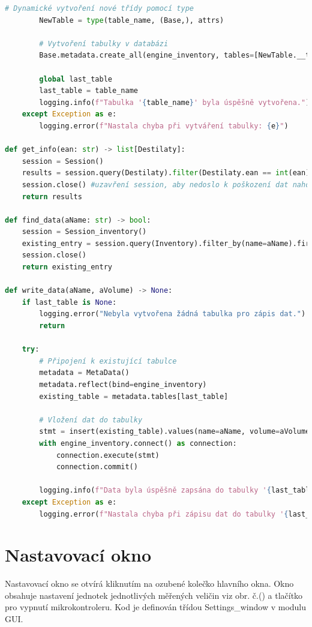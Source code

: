 \begin{lstlisting}[language=Python, caption=Ukázka třídy pro čtečku čárového kódu, frame=single]
        # Dynamické vytvoření nové třídy pomocí type
        NewTable = type(table_name, (Base,), attrs)
        
        # Vytvoření tabulky v databázi
        Base.metadata.create_all(engine_inventory, tables=[NewTable.__table__])

        global last_table
        last_table = table_name
        logging.info(f"Tabulka '{table_name}' byla úspěšně vytvořena.")
    except Exception as e:
        logging.error(f"Nastala chyba při vytváření tabulky: {e}")

def get_info(ean: str) -> list[Destilaty]:
    session = Session()
    results = session.query(Destilaty).filter(Destilaty.ean == int(ean)).all()
    session.close() #uzavření session, aby nedoslo k poškození dat nahodou
    return results

def find_data(aName: str) -> bool:
    session = Session_inventory()
    existing_entry = session.query(Inventory).filter_by(name=aName).first() #kontrola zda nepřídávám už existující prvek
    session.close()
    return existing_entry

def write_data(aName, aVolume) -> None:
    if last_table is None:
        logging.error("Nebyla vytvořena žádná tabulka pro zápis dat.")
        return
    
    try:
        # Připojení k existující tabulce
        metadata = MetaData()
        metadata.reflect(bind=engine_inventory)
        existing_table = metadata.tables[last_table]
        
        # Vložení dat do tabulky
        stmt = insert(existing_table).values(name=aName, volume=aVolume)
        with engine_inventory.connect() as connection:
            connection.execute(stmt)
            connection.commit()
        
        logging.info(f"Data byla úspěšně zapsána do tabulky '{last_table}'.")
    except Exception as e:
        logging.error(f"Nastala chyba při zápisu dat do tabulky '{last_table}': {e}")

\end{lstlisting}

\section{Nastavovací okno}
Nastavovací okno se otvírá kliknutím na ozubené kolečko hlavního okna. Okno obsahuje nastavení jednotek jednotlivých měřených veličin viz obr. č.() a tlačítko pro vypnutí mikrokontroleru. Kod je definován třídou Settings\_window v modulu GUI.

